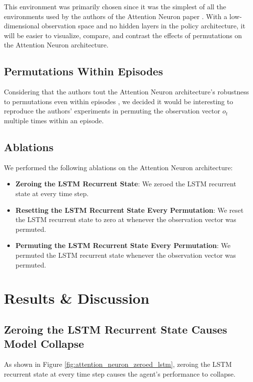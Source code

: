 \documentclass{article}
\begin{document}
This environment was primarily chosen since it was the simplest of all the environments used
by the authors of the Attention Neuron paper \cite{Tang-and-Ha-2021}. With a low-dimensional observation space
and no hidden layers in the policy architecture, it will be easier to visualize, compare, and contrast the effects of permutations
on the Attention Neuron architecture.

\subsection{Permutations Within Episodes}
Considering that the authors tout the Attention Neuron architecture's robustness to permutations
even within episodes \cite{Tang-and-Ha-2021},
we decided it would be interesting to reproduce the authors' experiments 
in permuting the observation vector $o_t$ multiple times within an episode.

\subsection{Ablations}
We performed the following ablations on the Attention Neuron architecture:
\begin{itemize}
    \item \textbf{Zeroing the LSTM Recurrent State}: We zeroed the LSTM recurrent state at every time step.
    \item \textbf{Resetting the LSTM Recurrent State Every Permutation}: 
        We reset the LSTM recurrent state to zero at whenever the observation vector was permuted.
    \item \textbf{Permuting the LSTM Recurrent State Every Permutation}: 
        We permuted the LSTM recurrent state whenever the observation vector was permuted.        
\end{itemize}

\section{Results \& Discussion}

\subsection{Zeroing the LSTM Recurrent State Causes Model Collapse}
As shown in Figure \ref{fig:attention_neuron_zeroed_lstm},
zeroing the LSTM recurrent state at every time step causes the agent's performance to collapse.
\end{document}
